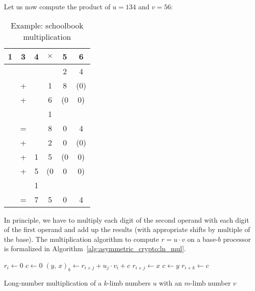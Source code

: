 Let us now compute the product of $u = 134$ and $v = 56$:

\begin{table}[htbp]
	\centering
		\begin{tabular}{c c c c c c}
			1 & 3 & 4 & $\times$ & 5 & 6  \\\hline
			  &    &     &                &  2 & 4 \\
			  &  + & &             1 & 8  & (0)   \\
			  & +  &  &            6  &  (0  &  0)  \\
			  &    &    &            \footnotesize{1}  &   &    \\ \hline
                        & =  &  &            8   &   0  &   4    \\ 
			  & + &    &             2  &   0  &  (0)    \\
			  & + & 1 &             5  &   (0  & 0)       \\
			  & +  & 5 &             (0   &   0 &   0)   \\ 
			  &    &  \footnotesize{1}  &      &   &    \\ \hline
			  & =  & 7 &            5   &   0  &   4    \\ 
		\end{tabular}
	\caption{Example: schoolbook multiplication}
	\label{tab:asymmetric_crypto:mulb10}
\end{table}

In principle, we have to multiply each digit of the second operand with each digit of the first operand and add up the results (with appropriate shifts by multiple of the base). The multiplication algorithm to compute $r = u \cdot v$ on a base-$b$ processor is formalized in Algorithm~\ref{alg:asymmetric_crypto:ln_mul}.


\begin{algorithm}
\center
\begin{algorithmic}
\vspace{2mm}

	\State $r_i \gets 0$
\EndFor
\vspace{1mm}
	\State $c \gets 0$
	\vspace{.5mm} 
            \State $\left(y,\,x\right)_b \gets r_{i+j} + u_j\cdot v_i + c $
            \State $r_{i+j} \gets x$
            \State $c \gets y$
        \EndFor
        \vspace{.5mm}
        \State $r_{i + k} \gets c$
        \vspace{1mm}
\EndFor

\vspace{2mm}
\end{algorithmic}
\caption{Long-number multiplication of a $k$-limb numbers $u$ with an $m$-limb number $v$}
\label{alg:asymmetric_crypto:ln_mul}
\end{algorithm}

